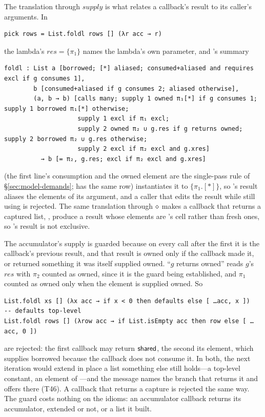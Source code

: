 The translation through $\mathit{supply}$ is what relates a callback's result to its caller's
arguments. In
\begin{Verbatim}
pick rows = List.foldl rows [] (λr acc → r)
\end{Verbatim}
the lambda's $\mathit{res} = \{\pi_1\}$ names the lambda's own parameter, and 's summary
\begin{Verbatim}
foldl : List a [borrowed; [*] aliased; consumed+aliased and requires excl if g consumes 1],
        b [consumed+aliased if g consumes 2; aliased otherwise],
        (a, b → b) [calls many; supply 1 owned π₁[*] if g consumes 1; supply 1 borrowed π₁[*] otherwise;
                    supply 1 excl if π₁ excl;
                    supply 2 owned π₂ ∪ g.res if g returns owned; supply 2 borrowed π₂ ∪ g.res otherwise;
                    supply 2 excl if π₂ excl and g.xres]
          → b [= π₂, g.res; excl if π₂ excl and g.xres]
\end{Verbatim}
(the first line's consumption and the owned element are the single-pass rule of
\S\ref{sec:model-demands};  has the same row) instantiates it to $\{\pi_1.[\ast]\}$, so 's result aliases the elements of its argument, and
a caller that edits the result while still using  is rejected. The same translation through
$\diamond$ makes a callback that returns a captured list, , produce a result
whose elements are 's cell rather than fresh ones, so 's result is not exclusive.

The accumulator's supply is guarded because on every call after the first it is the callback's previous
result, and that result is owned only if the callback made it, or returned something it was itself
supplied owned. ``$g$ returns owned'' reads $g$'s $\mathit{res}$ with $\pi_2$ counted as owned, since it is
the guard being established, and $\pi_1$ counted as owned only when the element is supplied owned. So
\begin{Verbatim}
List.foldl xs [] (λx acc → if x < 0 then defaults else [ …acc, x ])       -- defaults top-level
List.foldl rows [] (λrow acc → if List.isEmpty acc then row else [ …acc, 0 ])
\end{Verbatim}
are rejected: the first callback may return $\mathsf{shared}$, the second its element, which 
supplies borrowed because the callback does not consume it. In both, the next iteration would extend in
place a list something else still holds---a top-level constant, an element of ---and the
message names the branch that returns it and offers  there (T46). A callback that returns a
capture is rejected the same way. The guard costs nothing on the idioms: an accumulator callback returns
its accumulator, extended or not, or a list it built.

